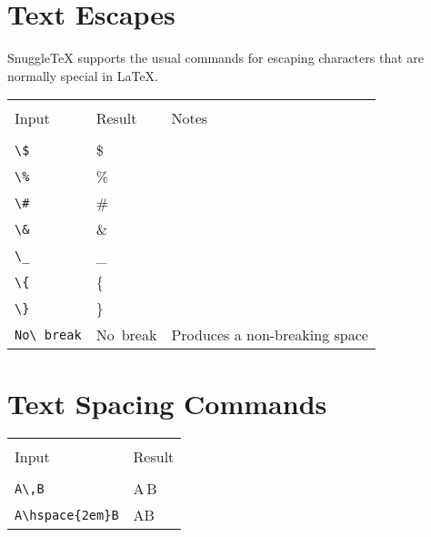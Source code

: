 
\newenvironment{demotable}
{\begin{center}
 \begin{tabular}{|l|l|}
 \hline \\
 Input & Result \\
 \hline \\
}{\hline
 \end{tabular}
 \end{center}
}

\newenvironment{ndemotable}
{\begin{center}
 \begin{tabular}{|l|l|l|}
 \hline \\
 Input & Result & Notes \\
 \hline \\
}{\hline
 \end{tabular}
 \end{center}
}

\newcommand{\note}[1]{\small #1}
\newcommand{\demo}[1]{\verb|#1| & #1 \\}
\newcommand{\ndemo}[2]{\verb|#1| & #1 & \note{#2} \\}
\newcommand{\bigdemo}[1]{\begin{verbatim}#1\end{verbatim} & #1 \\}

\section*{Text Escapes}

SnuggleTeX supports the usual commands for escaping characters that are normally
special in LaTeX.

\begin{ndemotable}
\demo{\$}
\demo{\%}
\demo{\#}
\demo{\&}
\demo{\_}
\demo{\{}
\demo{\}}
\ndemo{No\ break}{Produces a non-breaking space}
\end{ndemotable}

\section*{Text Spacing Commands}

\begin{demotable}
\demo{A\,B}
\demo{A\hspace{2em}B}
\end{demotable}

